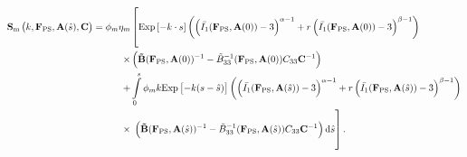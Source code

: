 \begin{equation} \label{eq:fullmatrix}
\begin{split}
\mathbf{S}_\mathrm{m}\left(k , \mathbf{F}_\mathrm{PS}, \mathbf{A}(\hat{s}), \mathbf{C}\right) = \phi_m \eta_m& \left[ \vphantom{\int\displaylimits_0^s} \mathrm{Exp}\left[-k  \cdot s\right]  \left(\left( \bar{I_1} (\mathbf{F}_\mathrm{PS}, \mathbf{A}(0)) - 3\right)^{\alpha - 1} + r \left( \bar{I_1} (\mathbf{F}_\mathrm{PS}, \mathbf{A}(0)) - 3\right)^{\beta - 1}\right)  \right.\\
\times& \left( \mathbf{\tilde{B}}(\mathbf{F}_\mathrm{PS}, \mathbf{A}(0))^{-1} - \tilde{B}_{33}^{-1}(\mathbf{F}_\mathrm{PS}, \mathbf{A}(0))C_{33}\mathbf{C}^{-1}\right) \\
+& \int\displaylimits_0^s \phi_m k  \mathrm{Exp}\left[-k (s - \hat{s})\right] \left(\left( \bar{I_1} (\mathbf{F}_\mathrm{PS}, \mathbf{A}(\hat{s})) - 3\right)^{\alpha - 1} + r \left( \bar{I_1} (\mathbf{F}_\mathrm{PS}, \mathbf{A}(\hat{s})) - 3\right)^{\beta - 1}\right) \\
\times& \left. \vphantom{\int\displaylimits_-^s} \left( \mathbf{\tilde{B}}(\mathbf{F}_\mathrm{PS}, \mathbf{A}(\hat{s}))^{-1} - \tilde{B}_{33}^{-1}(\mathbf{F}_\mathrm{PS}, \mathbf{A}(\hat{s}))C_{33}\mathbf{C}^{-1}\right) \mathrm{d}\hat{s}\right].
\end{split}
\end{equation}


